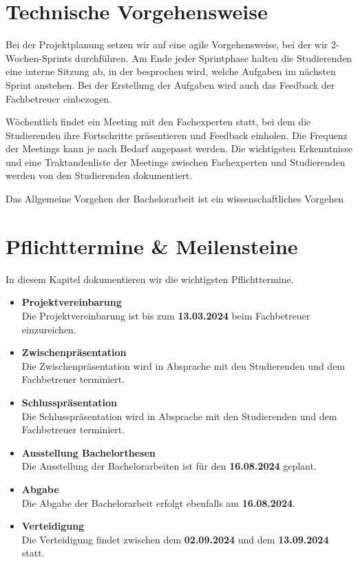 \section{Technische Vorgehensweise} %

Bei der Projektplanung setzen wir auf eine agile Vorgehensweise, bei der wir 2-Wochen-Sprints durchführen. Am Ende jeder Sprintphase halten die Studierenden eine interne Sitzung ab, in der besprochen wird, welche Aufgaben im nächsten Sprint anstehen. Bei der Erstellung der Aufgaben wird auch das Feedback der Fachbetreuer einbezogen.

Wöchentlich findet ein Meeting mit den Fachexperten statt, bei dem die Studierenden ihre Fortschritte präsentieren und Feedback einholen. Die Frequenz der Meetings kann je nach Bedarf angepasst werden. Die wichtigsten Erkenntnisse und eine Traktandenliste der Meetings zwischen Fachexperten und Studierenden werden von den Studierenden dokumentiert.

Das Allgemeine Vorgehen der Bachelorarbeit ist ein wissenschaftliches Vorgehen

\section{Pflichttermine \& Meilensteine}
In diesem Kapitel dokumentieren wir die wichtigsten Pflichttermine.

\begin{itemize}
    \item \textbf{Projektvereinbarung} \\
    Die Projektvereinbarung ist bis zum \textbf{13.03.2024} beim Fachbetreuer einzureichen.
    
    \item \textbf{Zwischenpräsentation} \\
    Die Zwischenpräsentation wird in Absprache mit den Studierenden und dem Fachbetreuer terminiert.
    
    \item \textbf{Schlusspräsentation} \\
    Die Schlusspräsentation wird in Absprache mit den Studierenden und dem Fachbetreuer terminiert. 

    \item \textbf{Ausstellung Bachelorthesen} \\
    Die Ausstellung der Bachelorarbeiten ist für den \textbf{16.08.2024} geplant.
    
    \item \textbf{Abgabe} \\
    Die Abgabe der Bachelorarbeit erfolgt ebenfalls am \textbf{16.08.2024}.

    \item \textbf{Verteidigung} \\
    Die Verteidigung findet zwischen dem \textbf{02.09.2024} und dem \textbf{13.09.2024} statt.
    
\end{itemize}

